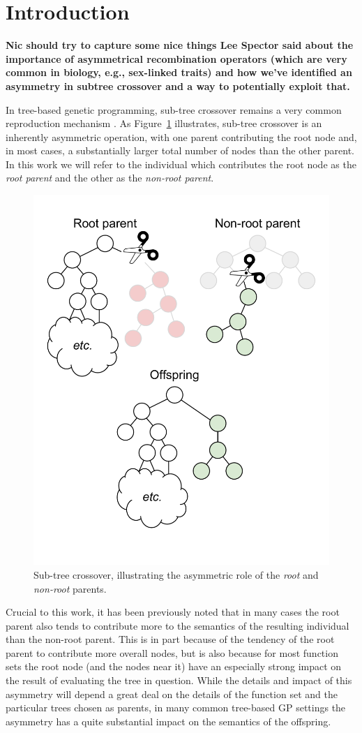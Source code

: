 \documentclass{sig-alternate}
\begin{document}
\category{}{}{}
\terms{}

\section{Introduction} \label{sec:Introduction}

\textbf{Nic should try to capture some nice things Lee Spector said about the importance of asymmetrical recombination
operators (which are very common in biology, e.g., sex-linked traits) and how we've identified an asymmetry in subtree
crossover and a way to potentially exploit that.}

In tree-based genetic programming, sub-tree crossover remains a very common reproduction mechanism
\cite{poli08:fieldguide}. As Figure~\ref{fig:root_parent_illustration} illustrates, sub-tree crossover is an inherently
asymmetric operation, with one parent contributing the root node and, in most cases, a substantially larger total
number of nodes than the other parent. In this work we will refer to the individual which contributes the root node as
the \emph{root parent} and the other as the \emph{non-root parent}.

\begin{figure}
\centering
\includegraphics[width=0.45 \textwidth]{Plots/Root_parent_illustration_no_triangle.pdf}
\caption{Sub-tree crossover, illustrating the asymmetric role of the \emph{root} and \emph{non-root} parents.}
\label{fig:root_parent_illustration}
\end{figure}

Crucial to this work, it has been previously noted 
\cite{McPheeDonatucciDramdahl:2014, McPhee:2008:SBB:1792694.1792707} 
that in many cases the root parent also tends to contribute more to the semantics of the resulting 
individual than the non-root parent. This is in part because of the tendency of the root parent to contribute more 
overall nodes, but is also because for most function sets the root node (and the nodes near it) have an especially 
strong impact on the result of evaluating the tree in question. While the details and impact of this asymmetry will 
depend a great deal on the details of the function set and the particular trees chosen as parents, in many common 
tree-based GP settings the asymmetry has a quite substantial impact on the semantics of the offspring.
\end{document}
